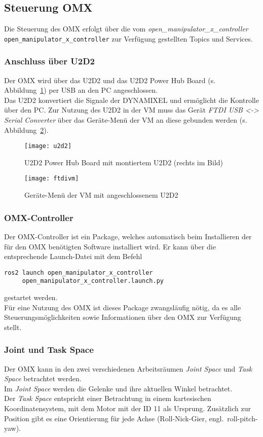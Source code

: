 \subsection{Steuerung OMX}
Die Steuerung des OMX erfolgt über die vom \emph{open\_manipulator\_x\_controller}\\ \verb|open_manipulator_x_controller| zur Verfügung gestellten Topics und Services.

\subsubsection{Anschluss über U2D2}{\label{u2d2}}
Der OMX wird über das U2D2 und das U2D2 Power Hub Board (s. Abbildung~\ref{fig:u2d2}) per USB an den PC angeschlossen.\\
Das U2D2 konvertiert die Signale der DYNAMIXEL und ermöglicht die Kontrolle über den PC.
Zur Nutzung des U2D2 in der \ac{VM} muss das Gerät \emph{FTDI USB <-> Serial Converter} über das Geräte-Menü der \ac{VM} an diese gebunden werden (s. Abbildung~\ref{fig:ftdivm}).
\begin{figure}[ht!]
\centering
\texttt{[image: u2d2]}
\caption{U2D2 Power Hub Board mit montiertem U2D2 (rechts im Bild)}
\label{fig:u2d2}
\end{figure}
\begin{figure}[ht!]
\centering
\texttt{[image: ftdivm]}
\caption{Geräte-Menü der \ac{VM} mit angeschlossenem U2D2}
\label{fig:ftdivm}
\end{figure}


\subsubsection{OMX-Controller}
Der OMX-Controller ist ein Package, welches automatisch beim Installieren der für den OMX benötigten Software installiert wird.
Er kann über die entsprechende Launch-Datei mit dem Befehl
\begin{verbatim}
ros2 launch open_manipulator_x_controller 
     open_manipulator_x_controller.launch.py
\end{verbatim}
gestartet werden.\\
Für eine Nutzung des OMX ist dieses Package zwangsläufig nötig, da es alle Steuerungsmöglichkeiten sowie Informationen über den OMX zur Verfügung stellt.
\subsubsection{Joint und Task Space}
Der OMX kann in den zwei verschiedenen Arbeitsräumen \emph{Joint Space} und \emph{Task Space} betrachtet werden.\\
Im \emph{Joint Space} werden die Gelenke und ihre aktuellen Winkel betrachtet.\\
Der \emph{Task Space} entspricht einer Betrachtung in einem kartesischen Koordinatensystem, mit dem Motor mit der ID 11 als Ursprung.
Zusätzlich zur Position gibt es eine Orientierung für jede Achse (Roll-Nick-Gier, engl.\ roll-pitch-yaw).
